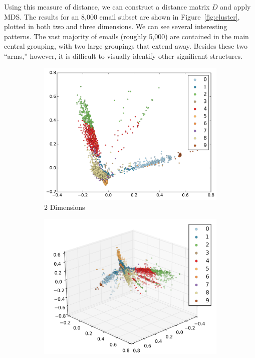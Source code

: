 \documentclass[12pt]{article}
\theoremstyle{definition}
\theoremstyle{algodesc}
\begin{document}
Using this measure of distance, we can construct a distance matrix $D$ and apply MDS. The results for an 8,000 email subset are shown in Figure~\ref{fig:cluster}, plotted in both two and three dimensions. We can see several interesting patterns. The vast majority of emails (roughly 5,000) are contained in the main central grouping, with two large groupings that extend away. Besides these two ``arms,'' however, it is difficult to visually identify other significant structures.

\begin{figure}[htbp] \centering
  \begin{subfigure}[t]{.7\linewidth}
    \includegraphics[width=\linewidth]{../images/mds_2d_cluster.png}
    \caption{2 Dimensions} \label{fig:cluster:2d}
  \end{subfigure}
  \begin{subfigure}[t]{.7\linewidth}
    \includegraphics[width=\linewidth]{../images/mds_3d_cluster_1.png}

\end{subfigure}
\end{figure}
\end{document}
